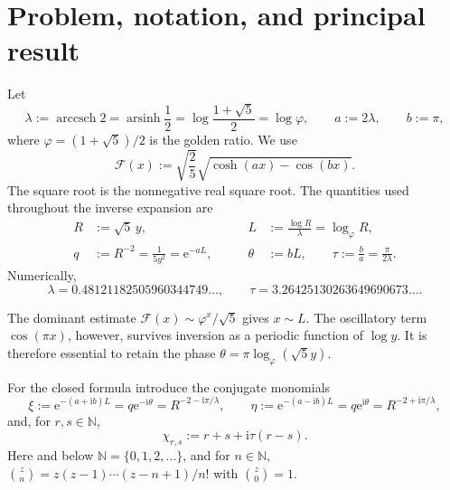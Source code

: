 \documentclass[11pt,oneside]{article}
\numberwithin{equation}{section}
\newcommand{\arsinh}{\operatorname{arsinh}}
\newcommand{\e}{\mathrm{e}}
\newcommand{\ii}{\mathrm{i}}
\newcommand{\NN}{\mathbb{N}}
\newcommand{\cF}{\mathcal{F}}
\begin{document}
\clearpage
\begingroup
\small
\setlength{\parskip}{0pt}
\tableofcontents
\endgroup
\clearpage

\section{Problem, notation, and principal result}
\label{sec:intro}

Let
\begin{equation}
  \lambda:=\operatorname{arccsch}2
  =\arsinh\frac12
  =\log\frac{1+\sqrt5}{2}
  =\log\varphi,
  \qquad
  a:=2\lambda,
  \qquad b:=\pi,
  \label{eq:constants}
\end{equation}
where \(\varphi=(1+\sqrt5)/2\) is the golden ratio.  We use
\begin{equation}
  \cF(x):=\sqrt{\frac25}\sqrt{\cosh(ax)-\cos(bx)}.
  \label{eq:F-def}
\end{equation}
The square root is the nonnegative real square root.  The quantities used
throughout the inverse expansion are
\begin{equation}
\begin{aligned}
  R&:=\sqrt5\,y,
  &\qquad
  L&:=\frac{\log R}{\lambda}=\log_\varphi R,\\
  q&:=R^{-2}=\frac1{5y^2}=\e^{-aL},
  &\qquad
  \theta&:=bL,
  \qquad
  \tau:=\frac ba=\frac{\pi}{2\lambda}.
\end{aligned}
  \label{eq:natural-variables}
\end{equation}
Numerically,
\begin{equation}
  \lambda=0.48121182505960344749\ldots,
  \qquad
  \tau=3.26425130263649690673\ldots.
\end{equation}

The dominant estimate \(\cF(x)\sim\varphi^x/\sqrt5\) gives \(x\sim L\).
The oscillatory term \(\cos(\pi x)\), however, survives inversion as a periodic
function of \(\log y\).  It is therefore essential to retain the phase
\(\theta=\pi\log_\varphi(\sqrt5y)\).

For the closed formula introduce the conjugate monomials
\begin{equation}
  \xi:=\e^{-(a+\ii b)L}=q\e^{-\ii\theta}
       =R^{-2-\ii\pi/\lambda},
  \qquad
  \eta:=\e^{-(a-\ii b)L}=q\e^{\ii\theta}
       =R^{-2+\ii\pi/\lambda},
  \label{eq:xi-eta}
\end{equation}
and, for \(r,s\in\NN\),
\begin{equation}
  \chi_{r,s}:=r+s+\ii\tau(r-s).
  \label{eq:chi}
\end{equation}
Here and below \(\NN=\{0,1,2,\ldots\}\), and for \(n\in\NN\),
\(
 \binom zn=z(z-1)\cdots(z-n+1)/n!
\)
with \(\binom z0=1\).
\end{document}
